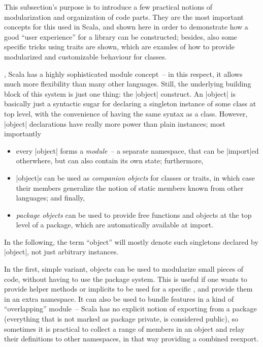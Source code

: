 This subsection's purpose is to introduce a few practical notions of modularization and organization
of code parts. They are the most important concepts for this used in Scala, and shown here in order
to demonstrate how a good \enquote{user experience} for a library can be constructed; besides, also
some specific tricks using traits are shown, which are examles of how to provide modularized and
customizable behaviour for classes.

, Scala has a highly sophisticated module
concept~-- in this respect, it allows much more flexibility than many other languages. Still, the
underlying building block of this system is just one thing: the |object| construct. An |object| is
basically just a syntactic sugar for declaring a singleton instance of some class at top level, with
the convenience of having the same syntax as a class. However, |object| declarations have really
more power than plain instances; most importantly
\begin{itemize}
\item every |object| forms a \emph{module}~-- a separate namespace, that can be |import|ed
  otherwhere, but can also contain its own state; furthermore,
\item |object|s can be used as \emph{companion objects} for classes or traits, in which case their
  members generalize the notion of static members known from other languages; and finally,
\item \emph{package objects} can be used to provide free functions and objects at the top level of a
  package, which are automatically available at import.
\end{itemize}
In the following, the term \enquote{object} will mostly denote such singletons declared by |object|,
not just arbitrary instances.

In the first, simple variant, objects can be used to modularize small pieces of code, without having
to use the package system. This is useful if one wants to provide helper methods or implicits to be
used for a specific \dsl{}, and provide them in an extra namespace. It can also be used to bundle
features in a kind of \enquote{overlapping} module~-- Scala has no explicit notion of exporting from
a package (everything that is not marked as package private, is considered public), so sometimes it
is practical to collect a range of members in an object and relay their definitions to other
namespaces, in that way providing a combined reexport.


